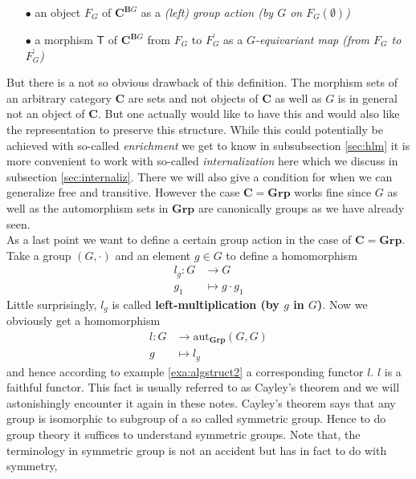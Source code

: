 \begin{exa}
\begin{enumerate}
\item[$\bullet$]
an object $F_{G}$ of $\mathbf{C}^{\mathbf{B}G}$ as a \textit{(left) group action (by $G$ on $F_{G}(\emptyset)$)}
\item[$\bullet$]
a morphism $\mathsf{T}$ of $\mathbf{C}^{\mathbf{B}G}$ from $F_{G}$ to $F_{G}^{\backprime}$ as a \textit{$G$-equivariant map (from $F_{G}$ to $F_{G}^{\backprime}$)}
\end{enumerate}
But there is a not so obvious drawback of this definition. The morphism sets of an arbitrary category $\mathbf{C}$ are sets and not objects of $\mathbf{C}$ as well as $G$ is in general not an object of $\mathbf{C}$. But one actually would like to have this and would also like the representation to preserve this structure. While this could potentially be achieved with so-called \textit{enrichment} we get to know in subsubsection \ref{sec:hlm} it is more convenient to work with so-called \textit{internalization} here which we discuss in subsection \ref{sec:internaliz}. There we will also give a condition for when we can generalize free and transitive. However the case $\mathbf{C} = \mathbf{Grp}$ works fine since $G$ as well as the automorphism sets in $\mathbf{Grp}$ are canonically groups as we have already seen.
\\
As a last point we want to define a certain group action in the case of $\mathbf{C} = \mathbf{Grp}$. Take a group $(G,\cdot)$ and an element $g \in G$ to define a homomorphism
\begin{align*}
  l_{g}
  \colon
  G
  &\rightarrow
  G
  \\
  g_{1}
  &\mapsto
  g
  \cdot
  g_{1}
\end{align*}
Little surprisingly, $l_{g}$ is called \textbf{left-multiplication (by $g$ in $G$)}. Now we obviously get a homomorphism
\begin{align*}
  l
  \colon
  G
  &\rightarrow
  \mathrm{aut}_{\mathbf{Grp}}(G,G)
  \\
  g
  &\mapsto
  l_{g}
\end{align*}
and hence according to example \ref{exa:algstruct2} a corresponding functor $l$. $l$ is a faithful functor. This fact is usually referred to as Cayley's theorem and we will astonishingly encounter it again in these notes. Cayley's theorem says that any group is isomorphic to subgroup of a so called symmetric group. Hence to do group theory it suffices to understand symmetric groups. Note that, the terminology in symmetric group is not an accident but has in fact to do with symmetry,
\end{exa}
